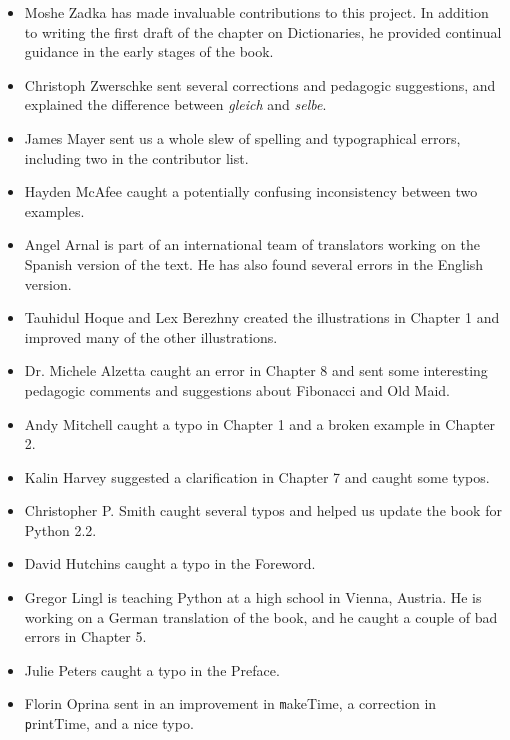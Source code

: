\documentclass[
DIV=11,
fontsize=12,
twoside,
headinclude=false,
titlepage=firstiscover,
abstract=true,
headsepline=true,
footsepline=true,
chapterprefix=true, %
headings=big,
bibliography=totoc,%
captions=tableheading
]{scrbook}
\theoremstyle{definition}
\begin{document}
\begin{itemize}
\item Moshe Zadka has made invaluable contributions to this project.
In addition to writing the first draft of the chapter on Dictionaries, he
provided continual guidance in the early stages of the book.

\item Christoph Zwerschke sent several corrections and
pedagogic suggestions, and explained the difference between {\em gleich}
and {\em selbe}.

\item James Mayer sent us a whole slew of spelling and
typographical errors, including two in the contributor list.

\item Hayden McAfee caught a potentially confusing inconsistency
between two examples.

\item Angel Arnal is part of an international team of translators
working on the Spanish version of the text.  He has also found several
errors in the English version.

\item Tauhidul Hoque and Lex Berezhny created the illustrations
in Chapter 1 and improved many of the other illustrations.

\item Dr. Michele Alzetta caught an error in Chapter 8 and sent
some interesting pedagogic comments and suggestions about Fibonacci
and Old Maid.

\item Andy Mitchell caught a typo in Chapter 1 and a broken example
in Chapter 2.

\item Kalin Harvey suggested a clarification in Chapter 7 and
caught some typos.

\item Christopher P. Smith caught several typos and helped us
update the book for Python 2.2.

\item David Hutchins caught a typo in the Foreword.

\item Gregor Lingl is teaching Python at a high school in Vienna,
Austria.  He is working on a German translation of the book,
and he caught a couple of bad errors in Chapter 5.

\item Julie Peters caught a typo in the Preface.

\item Florin Oprina sent in an improvement in {\texttt makeTime},
a correction in {\texttt printTime}, and a nice typo.


\end{itemize}
\end{document}
